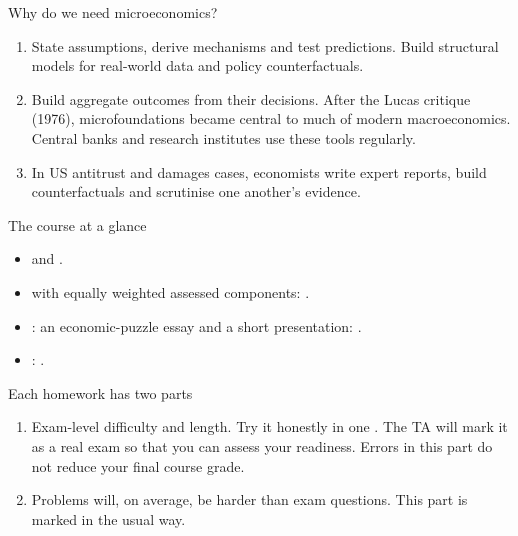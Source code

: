 \documentclass[handout,aspectratio=169,10pt]{beamer}
\begin{document}



\begin{frame}[label=why]{Why do we need microeconomics?}
\begin{enumerate}[<+->]
\item {} State assumptions, derive mechanisms and test predictions. Build structural models for real-world data and policy counterfactuals.
\item {} Build aggregate outcomes from their decisions. After the Lucas critique (1976), microfoundations became central to much of modern macroeconomics. Central banks and research institutes use these tools regularly.
\item {} In US antitrust and damages cases, economists write expert reports, build counterfactuals and scrutinise one another's evidence.
\end{enumerate}
\end{frame}

\begin{frame}[label=course-overview]{The course at a glance}
\begin{itemize}[<+->]
\item {} and .
\item {} with equally weighted assessed components: .
\item {}: an economic-puzzle essay and a short presentation: .
\item {}: .
\end{itemize}
\end{frame}

\begin{frame}[label=homework]{Each homework has two parts}
\begin{enumerate}[<+->]
\item {} Exam-level difficulty and length. Try it honestly in one . The TA will mark it as a real exam so that you can assess your readiness. \alert{Errors in this part do not reduce your final course grade.}
\item {} Problems will, on average, be harder than exam questions. This part is marked in the usual way.
\end{enumerate}
\end{frame}
\end{document}
